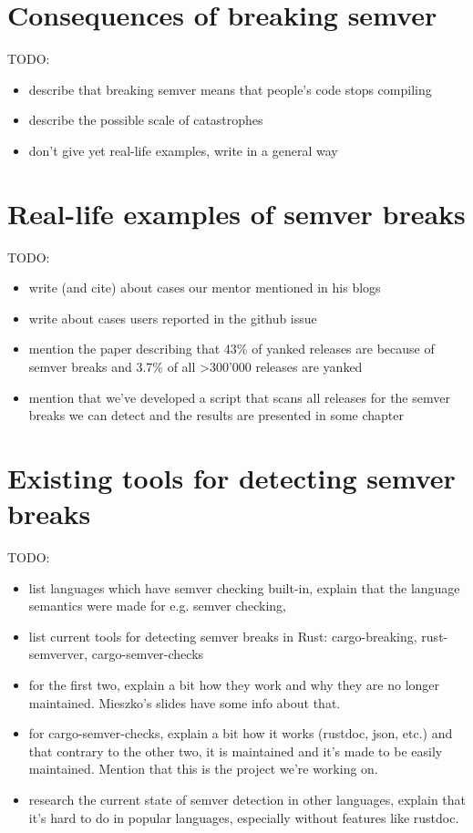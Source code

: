 \documentclass[licencjacka,en]{pracamgr}
\begin{document}
\section{Consequences of breaking semver}

TODO:
\begin{itemize}
	\item describe that breaking semver means that people's code stops compiling
	\item describe the possible scale of catastrophes
	\item don't give yet real-life examples, write in a general way
\end{itemize}

\section{Real-life examples of semver breaks}

TODO:
\begin{itemize}
	\item write (and cite) about cases our mentor mentioned in his blogs
	\item write about cases users reported in the github issue
	\item mention the paper describing that 43\% of yanked releases
		are because of semver breaks and 3.7\% of all >300'000 releases are yanked
	\item mention that we've developed
		a script that scans all releases for the semver breaks
		we can detect and the results are presented in some chapter
\end{itemize}

\section{Existing tools for detecting semver breaks}

TODO:
\begin{itemize}
	\item list languages which have semver checking built-in,
		explain that the language semantics were made for e.g. semver checking,
	\item list current tools for detecting semver breaks in Rust:
		cargo-breaking, rust-semverver, cargo-semver-checks
	\item for the first two, explain a bit how they work and why they are no longer maintained.
		Mieszko's slides have some info about that.
	\item for cargo-semver-checks, explain a bit how it works (rustdoc, json, etc.)
		and that contrary to the other two, it is maintained and it's made to be easily maintained.
		Mention that this is the project we're working on.
	\item research the current state of semver detection in other languages,
		explain that it's hard to do in popular languages,
		especially without features like rustdoc.
\end{itemize}
\end{document}

